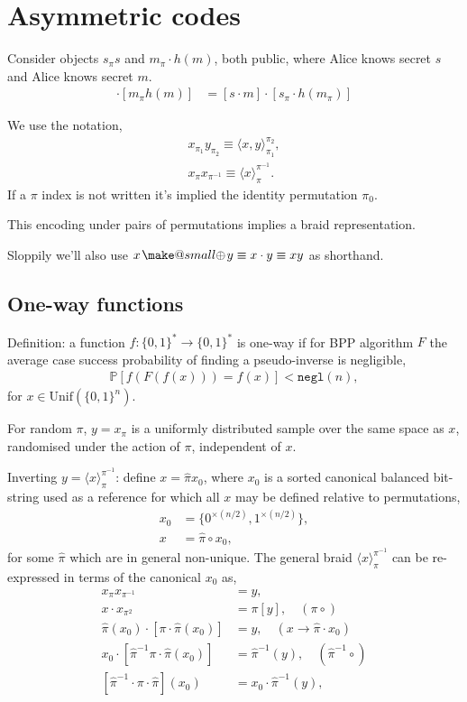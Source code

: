 \documentclass[twocolumn, aps, amsmath, amssymb, nofootinbib, superscriptaddress, longbibliography, doublefloatfix, table-of-contents, eqsecnum, rmp]{revtex4-2}
\makeatletter
\def\braid#1#2#3#4{\langle#1,#2\rangle_{#3}^{#4}}
\def\selfbraid#1#2#3{\langle#1\rangle_{#2}^{#3}}
\def\symbraid#1{\langle#1\rangle_{\pi}^{\pi^{-1}}}
\newcommand{\soplus}{{{\hspace{1pt}}{\mathbin{\mathpalette\make@small{\mathbin\oplus}}}}{\hspace{1pt}}}
\newcommand{\make@small}[2]{%
  \vcenter{\hbox{%
    \scalebox{0.6}{$\m@th#1#2$}%
  }}%
}
\makeatother
\begin{document}
\section{Asymmetric codes}

Consider objects $s_\pi s$ and $m_\pi \cdot h(m)$, both public, where Alice knows secret $s$ and Alice knows secret $m$.
\begin{align}
	[s_\pi s] \cdot [m_\pi h(m)] &= [s \cdot m] \cdot [s_\pi \cdot h(m_\pi)]
\end{align}

We use the notation,
\begin{align}
	x_{\pi_1} y_{\pi_2} \equiv \braid{x}{y}{\pi_1}{\pi_2},\nonumber\\
	x_{\pi} x_{\pi^{-1}} \equiv \selfbraid{x}{\pi}{\pi^{-1}}.
\end{align}
If a $\pi$ index is not written it's implied the identity permutation $\pi_0$.

This encoding under pairs of permutations implies a braid representation.

Sloppily we'll also use $x\soplus y \equiv x \cdot y \equiv xy$ as shorthand.

\subsection{One-way functions}

Definition: a function $f:\{0,1\}^* \to \{0,1\}^*$ is one-way if for BPP algorithm $F$ the average case success probability of finding a pseudo-inverse is negligible,
\begin{align}
	\mathbb{P}[f(F(f(x))) = f(x)] < \mathtt{negl}(n),
\end{align}
for $x\in\mathrm{Unif}(\{0,1\}^n)$.

For random $\pi$, $y=x_\pi$ is a uniformly distributed sample over the same space as $x$, randomised under the action of $\pi$, independent of $x$.

Inverting $y=\symbraid{x}$: define $x = \hat\pi x_0$, where $x_0$ is a sorted canonical balanced bit-string used as a reference for which all $x$ may be defined relative to permutations,
\begin{align}
	x_0 &= \{0^{\times(n/2)},1^{\times(n/2)}\},\nonumber\\
	x &= \hat\pi \circ x_0,
\end{align}
for some $\hat\pi$ which are in general non-unique. The general braid $\symbraid{x}$ can be re-expressed in terms of the canonical $x_0$ as,
\begin{align}
	x_\pi x_{\pi^{-1}} &= y,\nonumber\\
	x \cdot x_{\pi^2} &= \pi[y],\quad (\pi\circ)\nonumber\\
	\hat\pi(x_0) \cdot [\pi \cdot \hat\pi (x_0)] &= y,\quad (x\to \hat\pi \cdot x_0)\nonumber\\
	x_0 \cdot [\hat\pi^{-1} \pi \cdot \hat\pi (x_0)] &= \hat\pi^{-1}(y),\quad (\hat\pi^{-1}\circ)\nonumber\\
	[\hat\pi^{-1}\cdot \pi \cdot \hat\pi](x_0) &= x_0 \cdot \hat\pi^{-1}(y),\nonumber\\
\end{align}
\end{document}
